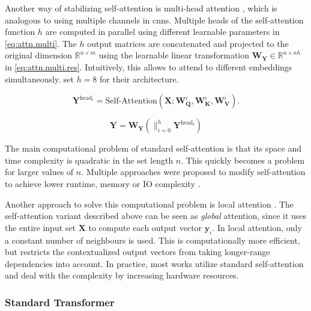 Another way of stabilizing self-attention is multi-head attention \citep{DBLP:conf/nips/VaswaniSPUJGKP17}, which is analogous to using multiple channels in \glspl{cnn}. Multiple heads of the self-attention function $h$ are computed in parallel using different learnable parameters in \autoref{eq:attn.multi}. The $h$ output matrices are concatenated and projected to the original dimension $\mathbb{R}^{n\times m}$ using the learnable linear transformation $\mathbf{W}_\mathbf{Y}\in\mathbb{R}^{n \times nh}$ in \autoref{eq:attn.multi.res}. Intuitively, this allows to attend to different embeddings simultaneously. \citet{DBLP:conf/nips/VaswaniSPUJGKP17} set $h=8$ for their architecture.

\begin{equation}
        \label{eq:attn.multi}
        \mathbf{Y}^{\text{head}_i}=\text{Self-Attention}(\mathbf{X}; \mathbf{W}^i_\mathbf{Q}, \mathbf{W}^i_\mathbf{K}, \mathbf{W}^i_\mathbf{V}).
\end{equation}

\begin{equation}
        \label{eq:attn.multi.res}
        \mathbf{Y}= \mathbf{W}_\mathbf{Y}  \left(\|_{i=0}^{h} \mathbf{Y}^{\text{head}_i}\right) 
\end{equation}


The main computational problem of standard self-attention is that its space and time complexity is quadratic in the set length $n$. This quickly becomes a problem for larger values of $n$. Multiple approaches were proposed to modify self-attention to achieve lower runtime, memory or IO complexity \citep{DBLP:conf/iclr/ChoromanskiLDSG21,DBLP:conf/nips/DaoFERR22}.

Another approach to solve this computational problem is local attention \citep{DBLP:conf/emnlp/LuongPM15}. The self-attention variant described above can be seen as \emph{global} attention, since it uses the entire input set $\mathbf{X}$ to compute each output vector $\mathbf{y}_i$. In local attention, only a constant number of neighbours is used. This is computationally more efficient, but restricts the contextualized output vectors from taking longer-range dependencies into account. In practice, most works utilize standard self-attention and deal with the complexity by increasing hardware resources.

\subsubsection{Standard Transformer}

